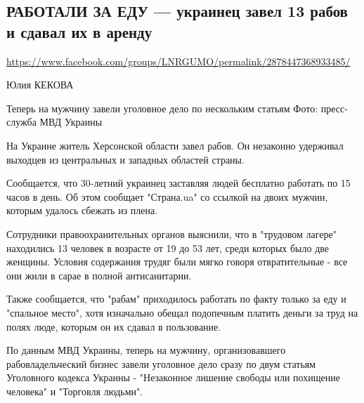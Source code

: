  
 
  
\subsection{РАБОТАЛИ ЗА ЕДУ --- украинец завел 13 рабов и сдавал их в аренду }
\url{https://www.facebook.com/groups/LNRGUMO/permalink/2878447368933485/}


Юлия КЕКОВА

Теперь на мужчину завели уголовное дело по нескольким статьям Фото:
пресс-служба МВД Украины

На Украине житель Херсонской области завел рабов.  Он незаконно удерживал
выходцев из центральных и западных областей страны.

Сообщается, что 30-летний украинец заставляя людей бесплатно работать по 15
часов в день.  Об этом сообщает "Страна.ua" со ссылкой на двоих мужчин, которым
удалось сбежать из плена.

Сотрудники правоохранительных органов выяснили, что в "трудовом лагере"
находились 13 человек в возрасте от 19 до 53 лет, среди которых было две
женщины. Условия содержания трудяг были мягко говоря отвратительные - все они
жили в сарае в полной антисанитарии.

Также сообщается, что "рабам" приходилось работать по факту только за еду и
"спальное место", хотя изначально обещал подопечным платить деньги за труд на
полях люде, которым он их сдавал в пользование.

По данным МВД Украины, теперь на мужчину, организовавшего рабовладельческий
бизнес завели уголовное дело сразу по двум статьям Уголовного кодекса Украины -
"Незаконное лишение свободы или похищение человека" и "Торговля людьми".
  

